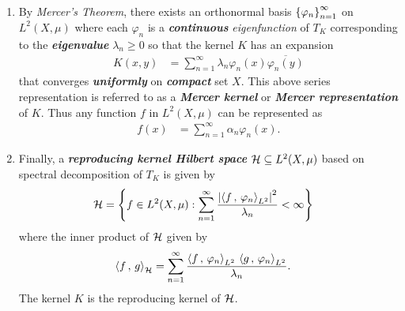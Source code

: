 \documentclass[11pt]{article}
\begin{document}
\begin{itemize}
\begin{remark}
\begin{enumerate}
\item By \emph{Mercer's Theorem}, there exists an orthonormal basis $\left\{\varphi_n\right\}_{n=1}^{\infty}$ on $L^2(X, \mu)$ where each $\varphi_n$ is a \emph{\textbf{continuous}} \emph{eigenfunction} of $T_K$ corresponding to the \emph{\textbf{eigenvalue}} $\lambda_n \ge 0$ so that the kernel $K$ has an expansion
\begin{align*}
K(x,y) &= \sum_{n=1}^{\infty}\lambda_{n}\varphi_n(x)\overline{\varphi_n(y)}
\end{align*} that  converges \textbf{\textit{uniformly}} on \textbf{\emph{compact}} set $X$. This above series representation is referred to as a \emph{\textbf{Mercer kernel}} or \emph{\textbf{Mercer representation}} of $K$. Thus any function $f$ in $L^2(X, \mu)$ can be represented as 
\begin{align*}
f(x) &= \sum_{n=1}^{\infty}\alpha_n \varphi_n(x).
\end{align*} 

\item Finally, a \emph{\textbf{reproducing kernel Hilbert space}} ${\mathcal H} \subseteq L^2(X, \mu)$ based on spectral decomposition of $T_K$ is given by 
\begin{align*}
{\mathcal H} &= \left\{f \in L^2(X, \mu): \sum_{n=1}^{\infty}\frac{\left\lvert \left\langle f\,,\, \varphi_n \right\rangle_{L^2} \right\rvert^2}{\lambda_n} < \infty \right\}
\end{align*} where the inner product of ${\mathcal H}$ given by
\begin{align*}
\left\langle f\,,\, g \right\rangle_{{\mathcal H}} &= \sum_{n=1}^{\infty}\frac{\left\langle f\,,\, \varphi_n \right\rangle_{L^2}\, \left\langle g\,,\, \varphi_n \right\rangle_{L^2}}{\lambda_n}.
\end{align*} The kernel $K$ is the reproducing kernel of ${\mathcal H}$.
\end{enumerate}
\end{remark}
\end{itemize}

%
\end{document}
